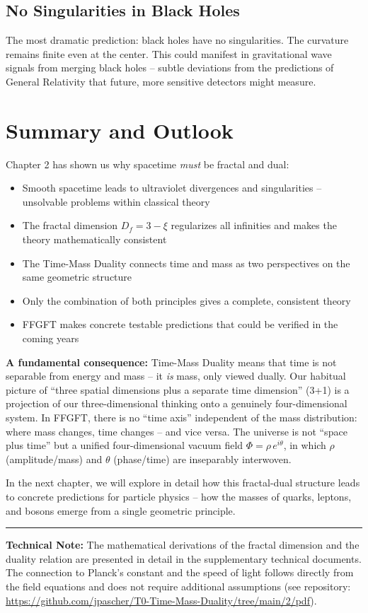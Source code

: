 \subsection{No Singularities in Black Holes}

The most dramatic prediction: black holes have no singularities. The curvature remains finite even at the center. This could manifest in gravitational wave signals from merging black holes -- subtle deviations from the predictions of General Relativity that future, more sensitive detectors might measure.

\section{Summary and Outlook}

Chapter 2 has shown us why spacetime \textit{must} be fractal and dual:

\begin{itemize}[leftmargin=*]
\item Smooth spacetime leads to ultraviolet divergences and singularities -- unsolvable problems within classical theory
\item The fractal dimension $D_f = 3 - \xi$ regularizes all infinities and makes the theory mathematically consistent
\item The Time-Mass Duality connects time and mass as two perspectives on the same geometric structure
\item Only the combination of both principles gives a complete, consistent theory
\item FFGFT makes concrete testable predictions that could be verified in the coming years
\end{itemize}

\textbf{A fundamental consequence:} Time-Mass Duality means that time is not separable from energy and mass -- it \textit{is} mass, only viewed dually. Our habitual picture of ``three spatial dimensions plus a separate time dimension'' (3+1) is a projection of our three-dimensional thinking onto a genuinely four-dimensional system. In FFGFT, there is no ``time axis'' independent of the mass distribution: where mass changes, time changes -- and vice versa. The universe is not ``space plus time'' but a unified four-dimensional vacuum field $\Phi = \rho\, e^{i\theta}$, in which $\rho$ (amplitude/mass) and $\theta$ (phase/time) are inseparably interwoven.

In the next chapter, we will explore in detail how this fractal-dual structure leads to concrete predictions for particle physics -- how the masses of quarks, leptons, and bosons emerge from a single geometric principle.

\vspace{1cm}
\hrule
\vspace{0.5cm}
\noindent\textbf{Technical Note:} The mathematical derivations of the fractal dimension and the duality relation are presented in detail in the supplementary technical documents. The connection to Planck's constant and the speed of light follows directly from the field equations and does not require additional assumptions (see repository: \url{https://github.com/jpascher/T0-Time-Mass-Duality/tree/main/2/pdf}).



